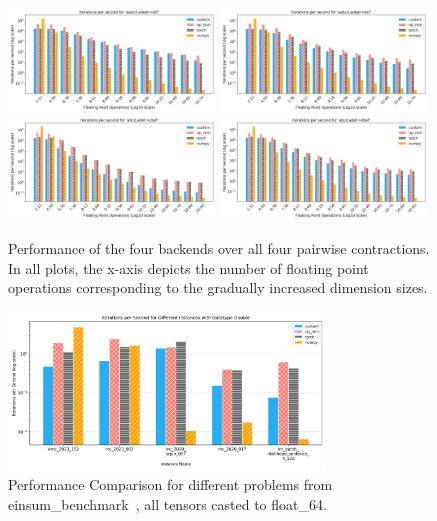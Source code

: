 \begin{figure}[H]
    \label{pic:all}
    \centering
    \includegraphics[width=0.49\textwidth]{images/aabcd_adeef__dcf.png} 
    \includegraphics[width=0.49\textwidth]{images/aabcd_adeef__bcf.png} \\
    \includegraphics[width=0.49\textwidth]{images/abcd_adef__cbef.png}
    \includegraphics[width=0.49\textwidth]{images/abcd_adef__dbef.png}
    \caption{Performance of the four backends over all four pairwise contractions. In all plots, the x-axis depicts the number of floating point operations corresponding to the gradually increased dimension sizes. }
\end{figure}

\begin{figure}[H]
    \label{pic:double}
    \centering
    \includegraphics[width=0.75\textwidth]{images/Datatype_Double.png}  %
    \caption{Performance Comparison for different problems from einsum\_benchmark~\cite{blacher2024einsum}, all tensors casted to float\_64.}
\end{figure}

